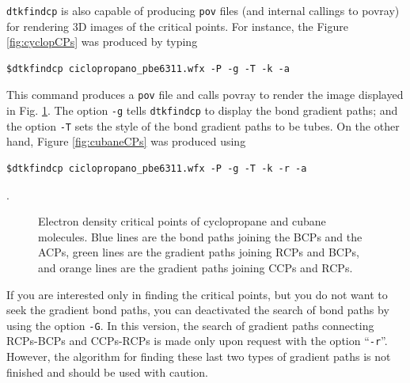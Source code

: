 \texttt{dtkfindcp} is also capable of producing \texttt{pov} files (and internal callings to povray) for rendering 3D images of the critical points. For instance, the Figure \ref{fig:cyclopCPs} was produced by typing\\
\begin{lstlisting}
$dtkfindcp ciclopropano_pbe6311.wfx -P -g -T -k -a
\end{lstlisting}
This command produces a \texttt{pov} file and calls povray to render the image displayed in Fig. \ref{fig:dtkfindcpusex}. The option \texttt{-g} tells \texttt{dtkfindcp} to display the bond gradient paths; and the option \texttt{-T} sets the style of the bond gradient paths to be tubes. On the other hand, Figure \ref{fig:cubaneCPs} was produced using \\\begin{lstlisting}
$dtkfindcp ciclopropano_pbe6311.wfx -P -g -T -k -r -a
\end{lstlisting}.
%
\begin{figure}[hb!]
\centering
{}
\caption{Electron density critical points of  cyclopropane and
 cubane molecules. Blue lines are the bond paths joining the BCPs and the ACPs,
green lines are the gradient paths joining RCPs and BCPs, and orange lines are the
gradient paths joining CCPs and RCPs.}\label{fig:dtkfindcpusex}
\end{figure}
%

If you are interested only in finding the critical points, but you do not want to seek the gradient bond paths, you can deactivated the search of bond paths by using the option \texttt{-G}. In this version, the search of gradient paths connecting RCPs-BCPs and CCPs-RCPs is made only upon request with the option ``\texttt{-r}''. However, the algorithm for finding these last two types of gradient paths is not finished and should be used with caution.

